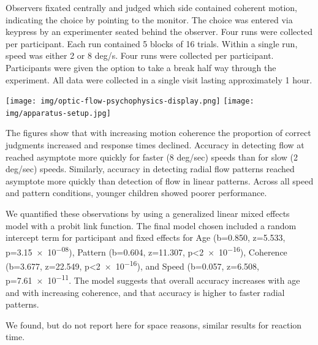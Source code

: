 \documentclass[landscape,final,paperwidth=60in,paperheight=39in,fontscale=0.285]{baposter}
\begin{document}
\begin{poster}
{\par Observers fixated centrally and judged which side contained coherent motion, indicating the choice by pointing to the monitor. The choice was entered via keypress by an experimenter seated behind the observer. Four runs were collected per participant. Each run contained 5 blocks of 16 trials. Within a single run, speed was either 2 or 8 deg/s. Four runs were collected per participant. Participants were given the option to take a break half way through the experiment. All data were collected in a single visit lasting approximately 1 hour.
    }
    {
\begin{center}
\texttt{[image: img/optic-flow-psychophysics-display.png]}
\texttt{[image: img/apparatus-setup.jpg]}
\end{center}
    }
    {
\par The figures show that with increasing motion coherence the proportion of correct judgments increased and response times declined. Accuracy in detecting flow at reached asymptote more quickly for faster (8 deg/sec) speeds than for slow (2 deg/sec) speeds. Similarly, accuracy in detecting radial flow patterns reached asymptote more quickly than detection of flow in linear patterns. Across all speed and pattern conditions, younger children showed poorer performance.
\par We quantified these observations by using a generalized linear mixed effects model with a probit link function. The final model chosen included a random intercept term for participant and fixed effects for Age (b=0.850, z=5.533, p=\num{3.15e-08}), Pattern (b=0.604, z=11.307, p<\num{2e-16}), Coherence (b=3.677, z=22.549, p<\num{2e-16}), and Speed (b=0.057, z=6.508, p=\num{7.61e-11}. The model suggests that overall accuracy increases with age and with increasing coherence, and that accuracy is higher to faster radial patterns. 
\par We found, but do not report here for space reasons, similar results for reaction time.
}


\end{poster}
\end{document}
